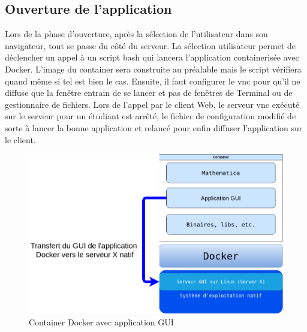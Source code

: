 \subsection{Ouverture de l'application}
Lors de la phase d'ouverture, après la sélection de l'utilisateur dans son navigateur, tout se passe du côté du serveur.
La sélection utilisateur permet de déclencher un appel à un script bash qui lancera l'application containerisée avec Docker.
L'image du container sera construite au préalable mais le script vérifiera quand même si tel est bien le cas.
Ensuite, il faut configurer le \acrshort{vnc} pour qu'il ne diffuse que la fenêtre entrain de se lancer et pas de fenêtres de Terminal ou de gestionnaire de fichiers.
Lors de l'appel par le client Web, le serveur \acrshort{vnc} exécuté sur le serveur pour un étudiant est arrêté, le fichier de configuration modifié de sorte à lancer la bonne application et relancé pour enfin diffuser l'application sur le client.

\begin{figure}[H]
	\centering
	\includegraphics[scale=0.35]{images/container.png}
	\caption{Container Docker avec application GUI}
	\label{fig:cont}
\end{figure}


